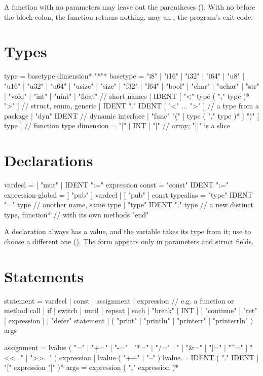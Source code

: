 \noindent A function with no parameters may leave out the parentheses
(). With no  before the block colon, the function
returns nothing.  may  an , the program's exit
code.

\section*{Types}

\begin{shell}
type        = basetype dimension* "*"*
basetype    = "i8" | "i16" | "i32" | "i64"
            | "u8" | "u16" | "u32" | "u64" | "usize" | "size"
            | "f32" | "f64"
            | "bool" | "char" | "uchar" | "str" | "void"
            | "int" | "uint" | "float"           // short names
            | IDENT [ "<" type ( "," type )* ">" ]   // struct, enum, generic
            | IDENT "." IDENT [ "<" ... ">" ]    // a type from a package
            | "dyn" IDENT                        // dynamic interface
            | "func" "(" [ type ( "," type )* ] ")" [ type ]   // function type
dimension   = "[" [ INT ] "]"                    // array; "[]" is a slice
\end{shell}

\section*{Declarations}

\begin{shell}
vardecl     = [ "mut" ] IDENT ":=" expression
const       = "const" IDENT ":=" expression
global      = [ "pub" ] vardecl | [ "pub" ] const
typealias   = "type" IDENT "=" type              // another name, same type
            | "type" IDENT ":" type              // a new distinct type,
                  function*                      //   with its own methods
              "end"
\end{shell}

\noindent A declaration always has a value, and the variable takes its type
from it; use  to choose a different one (). The
 form appears only in parameters and struct fields.

\section*{Statements}

\begin{shell}
statement   = vardecl | const
            | assignment
            | expression                 // e.g. a function or method call
            | if | switch | until | repeat | each
            | "break" [ INT ] | "continue"
            | "ret" [ expression ]
            | "defer" statement
            | ( "print" | "println" | "printerr" | "printerrln" ) args

assignment  = lvalue ( "=" | "+=" | "-=" | "*=" | "/=" | "%
                     | "&=" | "|=" | "^=" | "<<=" | ">>=" ) expression
            | lvalue ( "++" | "--" )
lvalue      = IDENT ( "." IDENT | "[" expression "]" )*
args        = expression ( "," expression )*
\end{shell}

